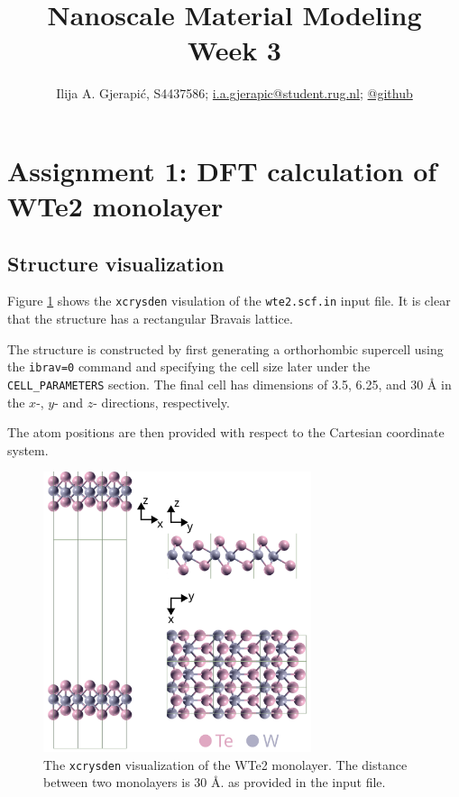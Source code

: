 \documentclass[10pt,a4paper]{labreport}
\title{Nanoscale Material Modeling
\\
\normalsize{Week 3}} %
\author{Ilija A. Gjerapić, S4437586; \href{mailto:i.a.gjerapic@student.rug.nl}{i.a.gjerapic@student.rug.nl}; \href{https://github.com/igjerapic/nmm-week3/}{@github} } %
\begin{document}
\maketitle

\tableofcontents

  

\thispagestyle{firststyle}
\newpage
\section{Assignment 1: DFT calculation of WTe2 monolayer}
\subsection{Structure visualization}

Figure \ref{fig:ass1_cryst} shows the \texttt{xcrysden} visulation of the \texttt{wte2.scf.in} input file. It is clear that the structure has a rectangular Bravais lattice. 

The structure is constructed by first generating a orthorhombic supercell using the \texttt{ibrav=0} command and specifying the cell size later under the \texttt{CELL\_PARAMETERS} section. The final cell has dimensions of 3.5, 6.25, and 30 {\AA} in the  $x$-, $y$- and $z$- directions, respectively.

The atom positions are then provided with respect to the Cartesian coordinate system.

  \begin{figure}[h]
    \centering 
    \includegraphics[width = 0.7\textwidth]{figs/ass1_WTe2_struct.png}
    \caption{The \texttt{xcrysden} visualization of the WTe2 monolayer. The distance between two monolayers is 30 \AA. as provided in the input file. }
    \label{fig:ass1_cryst}
  \end{figure}
\end{document}
